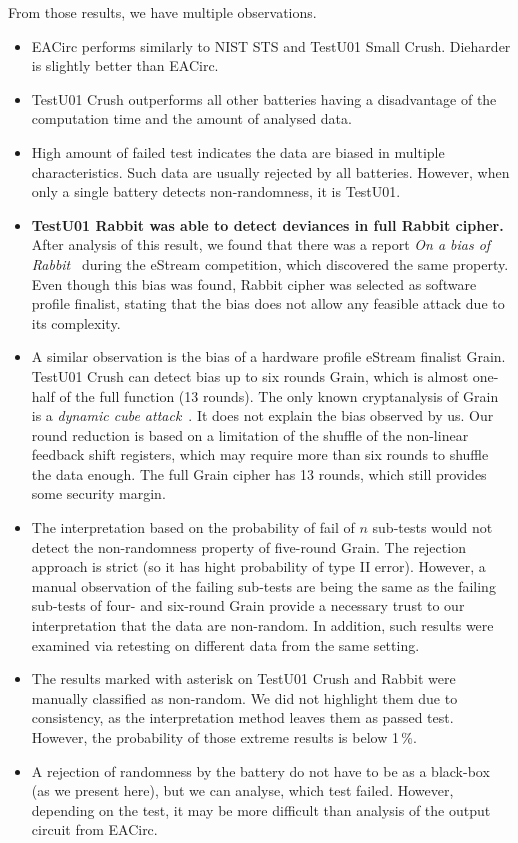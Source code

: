 \documentclass[
    digital,    %
    oneside,    %
    color,
    11pt,
    nocover,
    notable,
    nolof,
    nolot,
]{fithesis3}
\begin{document}
From those results, we have multiple observations.

\begin{itemize}
    \item EACirc performs similarly to NIST STS and TestU01 Small Crush. Dieharder is slightly better than EACirc.
    \item TestU01 Crush outperforms all other batteries having a disadvantage of the computation time and the amount of analysed data.
    \item High amount of failed test indicates the data are biased in multiple characteristics. Such data are usually rejected by all batteries. However, when only a single battery detects non-randomness, it is TestU01.
    \item \textbf{TestU01 Rabbit was able to detect deviances in full Rabbit cipher.} After analysis of this result, we found that there was a report \textit{On a bias of Rabbit}~\cite{aumasson2007bias} during the eStream competition, which discovered the same property. Even though this bias was found, Rabbit cipher was selected as software profile finalist, stating that the bias does not allow any feasible attack due to its complexity.
    \item A similar observation is the bias of a hardware profile eStream finalist Grain. TestU01 Crush can detect bias up to six rounds Grain, which is almost one-half of the full function (13 rounds). The only known cryptanalysis of Grain is a \textit{dynamic cube attack}~\cite{dinur2011breaking}. It does not explain the bias observed by us. Our round reduction is based on a limitation of the shuffle of the non-linear feedback shift registers, which may require more than six rounds to shuffle the data enough. The full Grain cipher has 13 rounds, which still provides some security margin.
    \item The interpretation based on the probability of fail of $n$ sub-tests would not detect the non-randomness property of five-round Grain. The rejection approach is strict (so it has hight probability of type II error). However, a manual observation of the failing sub-tests are being the same as the failing sub-tests of four- and six-round Grain provide a necessary trust to our interpretation that the data are non-random. In addition, such results were examined via retesting on different data from the same setting.
    \item The results marked with asterisk on TestU01 Crush and Rabbit were manually classified as non-random. We did not highlight them due to consistency, as the interpretation method leaves them as passed test. However, the probability of those extreme results is below 1\,\%.
    \item A rejection of randomness by the battery do not have to be as a black-box (as we present here), but we can analyse, which test failed. However, depending on the test, it may be more difficult than analysis of the output circuit from EACirc.


\end{itemize}
\end{document}

